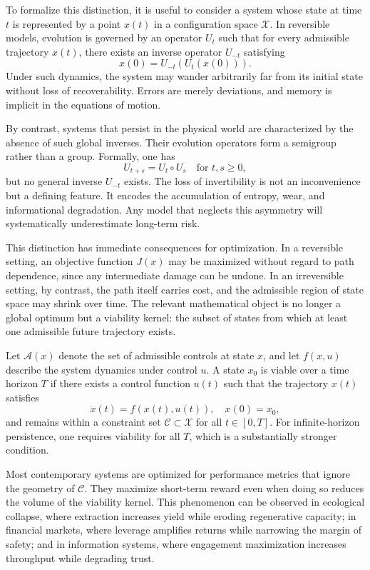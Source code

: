 \documentclass[12pt,oneside]{book}
\begin{document}
To formalize this distinction, it is useful to consider a system whose state at time \(t\) is represented by a point \(x(t)\) in a configuration space \(\mathcal{X}\). In reversible models, evolution is governed by an operator \(U_t\) such that for every admissible trajectory \(x(t)\), there exists an inverse operator \(U_{-t}\) satisfying
\[
x(0) = U_{-t}(U_t(x(0))).
\]
Under such dynamics, the system may wander arbitrarily far from its initial state without loss of recoverability. Errors are merely deviations, and memory is implicit in the equations of motion.

By contrast, systems that persist in the physical world are characterized by the absence of such global inverses. Their evolution operators form a semigroup rather than a group. Formally, one has
\[
U_{t+s} = U_t \circ U_s \quad \text{for } t,s \geq 0,
\]
but no general inverse \(U_{-t}\) exists. The loss of invertibility is not an inconvenience but a defining feature. It encodes the accumulation of entropy, wear, and informational degradation. Any model that neglects this asymmetry will systematically underestimate long-term risk.

This distinction has immediate consequences for optimization. In a reversible setting, an objective function \(J(x)\) may be maximized without regard to path dependence, since any intermediate damage can be undone. In an irreversible setting, by contrast, the path itself carries cost, and the admissible region of state space may shrink over time. The relevant mathematical object is no longer a global optimum but a viability kernel: the subset of states from which at least one admissible future trajectory exists.

Let \(\mathcal{A}(x)\) denote the set of admissible controls at state \(x\), and let \(f(x,u)\) describe the system dynamics under control \(u\). A state \(x_0\) is viable over a time horizon \(T\) if there exists a control function \(u(t)\) such that the trajectory \(x(t)\) satisfies
\[
\dot{x}(t) = f(x(t),u(t)), \quad x(0)=x_0,
\]
and remains within a constraint set \(\mathcal{C} \subset \mathcal{X}\) for all \(t \in [0,T]\). For infinite-horizon persistence, one requires viability for all \(T\), which is a substantially stronger condition.

Most contemporary systems are optimized for performance metrics that ignore the geometry of \(\mathcal{C}\). They maximize short-term reward even when doing so reduces the volume of the viability kernel. This phenomenon can be observed in ecological collapse, where extraction increases yield while eroding regenerative capacity; in financial markets, where leverage amplifies returns while narrowing the margin of safety; and in information systems, where engagement maximization increases throughput while degrading trust.
\end{document}

